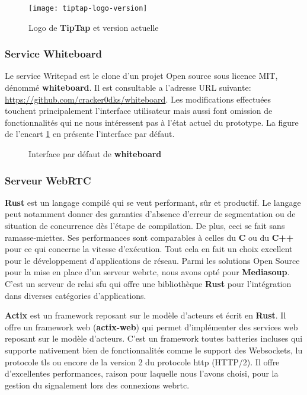 \begin{figure}[h]
  \centering
  \texttt{[image: tiptap-logo-version]}
  \caption{Logo de \textbf{TipTap} et version actuelle}
  \label{fig:whiteboard_demo}
\end{figure}

\subsubsection{Service Whiteboard}
Le service Writepad est le clone d’un projet Open source sous licence MIT, dénommé \textbf{whiteboard}. 
Il est consultable a l’adresse URL suivante: \href{https://github.com/cracker0dks/whiteboard}{https://github.com/cracker0dks/whiteboard}. 
Les modifications effectuées touchent principalement l’interface utilisateur mais aussi font omission de fonctionnalités qui ne nous intéressent pas à l'état actuel du prototype. 
La figure de l’encart \ref{fig:whiteboard_demo} en présente l’interface par défaut.


\begin{figure}[h]
  \centering
  \caption{Interface par défaut de \textbf{whiteboard}}
  \label{fig:tiptap_logo_and_version}
\end{figure}


\subsubsection{Serveur WebRTC}
\textbf{Rust} est un langage compilé qui se veut performant, sûr et productif\cite{rust}. 
Le langage peut notamment donner des garanties d'absence d'erreur de segmentation ou de situation de concurrence 
dès l'étape de compilation. De plus, ceci se fait sans ramasse-miettes. Ses performances sont comparables à celles du \textbf {C} ou du \textbf{C++} pour ce qui concerne la vitesse d'exécution. 
Tout cela en fait un choix excellent pour le développement d'applications de réseau. Parmi les solutions Open Source pour la mise en place d’un serveur \acrshort{webrtc}, 
nous avons opté pour \textbf{Mediasoup}. C’est un serveur de relai \acrshort{sfu} qui offre une bibliothèque \textbf{Rust} pour l'intégration dans diverses catégories d'applications. 

\textbf{Actix} est un framework reposant sur le modèle d’acteurs \cite{actor_design_pattern} et écrit en \textbf{Rust}. 
Il offre un framework web (\textbf{actix-web}) qui permet d’implémenter des services web reposant sur le modèle d’acteurs. 
C’est un framework toutes batteries incluses qui supporte nativement bien de fonctionnalités comme le support des Websockets, lu protocole \acrshort{tls} ou encore de la version 2 du protocole \acrshort{http} (HTTP/2). 
Il offre d’excellentes performances, raison pour laquelle nous l’avons choisi, pour la gestion du signalement lors des connexions \acrshort{webrtc}.

